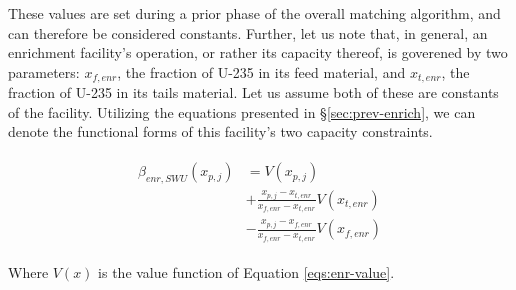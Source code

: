 These values are set during a prior phase of the overall matching algorithm, and
can therefore be considered constants. Further, let us note that, in general, an
enrichment facility's operation, or rather its capacity thereof, is goverened by
two parameters: $x_{f,enr}$, the fraction of U-235 in its feed material, and
$x_{t,enr}$, the fraction of U-235 in its tails material. Let us assume both of
these are constants of the facility. Utilizing the equations presented in
\S\ref{sec:prev-enrich}, we can denote the functional forms of this facility's
two capacity constraints.

\begin{align}\label{eqs:enr-swu-constr}
\begin{split}
\beta_{enr,SWU}(x_{p,j}) & = V(x_{p,j}) \\
& + \frac{x_{p,j} - x_{t,enr}}{x_{f,enr} - x_{t,enr}} V(x_{t,enr}) \\
& - \frac{ x_{p,j} - x_{f,enr} } { x_{f,enr} - x_{t,enr} } V(x_{f,enr})
\end{split}
\end{align}

Where $V(x)$ is the value function of Equation \ref{eqs:enr-value}.